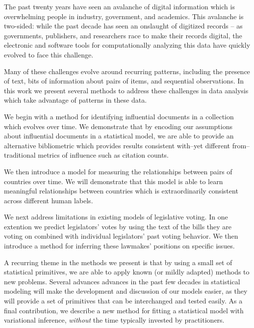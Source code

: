 The past twenty years have seen an avalanche of digital information which is overwhelming people in industry, government, and academics.  This avalanche is two-sided: while the past decade has seen an onslaught of digitized records -- as governments, publishers, and researchers race to make their records digital, the electronic and software tools for computationally analyzing this data have quickly evolved to face this challenge.

Many of these challenges evolve around recurring patterns, including the presence of text, bits of information about pairs of items, and sequential observations.  In this work we present several methods to address these challenges in data analysis which take advantage of patterns in these data.

We begin with a method for identifying influential documents in a collection which evolves over time.  We demonstrate that by encoding our assumptions about influential documents in a statistical model, we are able to provide an alternative bibliometric which provides results consistent with--yet different from--traditional metrics of influence such as citation counts.

We then introduce a model for measuring the relationships between pairs of countries over time.  We will demonstrate that this model is able to learn meaningful relationships between countries which is extraordinarily consistent across different human labels.

We next address limitations in existing models of legislative voting.  In one extention we predict legislators' votes by using the text of the bills they are voting on combined with individual legislators' past voting behavior.  We then introduce a method for inferring these lawmakes' positions on specific issues.

A recurring theme in the methods we present is that by using a small set of statistical primitives, we are able to apply known (or mildly adapted) methods to new problems.  Several advances advances in the past few decades in statistical modeling will make the development and discussion of our models easier, as they will provide a set of primitives that can be interchanged and tested easily.  As a final contribution, we describe a new method for fitting a statistical model with variational inference, \emph{without} the time typically invested by practitioners.

